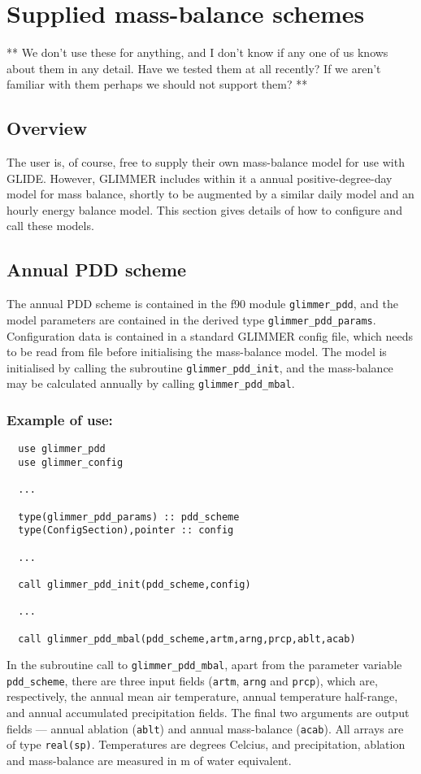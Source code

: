 \section{Supplied mass-balance schemes}

** We don't use these for anything, and I don't know if any one of us knows about them in any detail. Have we tested them at all recently? If we aren't familiar with them
perhaps we should not support them? **

\subsection{Overview}
The user is, of course, free to supply their own mass-balance model for use
with GLIDE. However, GLIMMER includes within it a annual positive-degree-day model
for mass balance, shortly to be augmented by a similar daily model and an
hourly energy balance model. This section gives details of how to configure
and call these models.
\subsection{Annual PDD scheme}
\label{ug.mbal.pdd_scheme}
The annual PDD scheme is contained in the f90 module \texttt{glimmer\_pdd},
and the model parameters are contained in the derived type
\texttt{glimmer\_pdd\_params}. Configuration data is contained in a standard
GLIMMER config file, which needs to be read from file before initialising the
mass-balance model. The model is initialised by calling the subroutine
\texttt{glimmer\_pdd\_init}, and the mass-balance may be calculated annually
by calling \texttt{glimmer\_pdd\_mbal}. 

\subsubsection{Example of use:}
\begin{verbatim}
  use glimmer_pdd
  use glimmer_config

  ...

  type(glimmer_pdd_params) :: pdd_scheme
  type(ConfigSection),pointer :: config

  ...

  call glimmer_pdd_init(pdd_scheme,config)

  ...

  call glimmer_pdd_mbal(pdd_scheme,artm,arng,prcp,ablt,acab)
\end{verbatim}
In the subroutine call to \texttt{glimmer\_pdd\_mbal}, apart from the
parameter variable \texttt{pdd\_scheme}, there are three input fields
(\texttt{artm}, \texttt{arng} and \texttt{prcp}), which are, respectively, the
annual mean air temperature, annual temperature half-range, and annual
accumulated precipitation fields. The final two arguments are output fields
--- annual ablation (\texttt{ablt}) and annual mass-balance
(\texttt{acab}). All arrays are of type \texttt{real(sp)}. Temperatures are
degrees Celcius, and precipitation, ablation and mass-balance are measured in
m of water equivalent.
%
%
%

